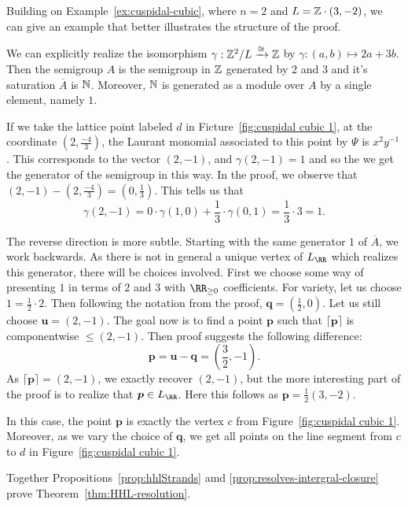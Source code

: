 \documentclass{amsart}
\begin{document}
\begin{example}
  Building on Example~\ref{ex:cuspidal-cubic}, where $n=2$ and $L=\mathbb Z\cdot (3,-2)$, we can give an example that better illustrates the structure of the proof.

  We can explicitly realize the isomorphism $\gamma:\mathbb Z^2/L\xrightarrow{\cong} \mathbb Z$ by $\gamma:(a,b)\mapsto 2a+3b$. Then the semigroup $A$ is the semigroup in $\mathbb Z$ generated by $2$ and $3$ and it's saturation $\overline{A}$ is $\mathbb N$. Moreover, $\mathbb N$ is generated as a module over $A$ by a single element, namely $1$.

  If we take the lattice point labeled $d$ in Ficture~\ref{fig:cuspidal cubic 1}, at the coordinate $(2,\frac{-4}{3})$, the Laurant monomial associated to this point by $\Psi$ is $x^2y^{-1}$.
  This corresponds to the vector $(2,-1)$, and $\gamma(2,-1)=1$ and so the we get the generator of the semigroup in this way.
  In the proof, we observe that $(2,-1)-(2,\frac{-4}{3})=(0,\frac{1}{3})$. This tells us that
  \[\gamma(2,-1) = 0\cdot \gamma(1,0) + \frac{1}{3}\cdot \gamma(0,1)=\frac{1}{3}\cdot 3 = 1.\]

  The reverse direction is more subtle. Starting with the same generator $1$ of $\overline{A}$, we work backwards. As there is not in general a unique vertex of $L_{\RR}$ which realizes this generator, there will be choices involved.
  First we choose some way of presenting $1$ in terms of $2$ and $3$ with $\RR_{\geq 0}$ coefficients. For variety, let us choose $1=\frac{1}{2}\cdot 2$.
  Then following the notation from the proof, $\mathbf{q}=(\frac{1}{2},0)$. Let us still choose $\bm{u}=(2,-1)$.
  The goal now is to find a point $\bm{p}$ such that $\lceil \bm{p} \rceil$ is componentwise $\leq (2,-1)$.
  Then proof suggests the following difference:
  \[\bm{p}=\bm{u}-\bm{q} = (\frac{3}{2},-1).\]
  As $\lceil \bm{p} \rceil = (2,-1)$, we exactly recover $(2,-1)$, but the more interesting part of the proof is to realize that $\bm{p}\in L_{\RR}$. Here this follows as $\bm{p}=\frac{1}{2}(3,-2)$.

  In this case, the point $\bm{p}$ is exactly the vertex $c$ from Figure~\ref{fig:cuspidal cubic 1}. Moreover, as we vary the choice of $\bm{q}$, we get all points on the line segment from $c$ to $d$ in Figure~\ref{fig:cuspidal cubic 1}. 
\end{example}

Together Propositions~\ref{prop:hhlStrands} amd \ref{prop:resolves-intergral-closure} prove Theorem~\ref{thm:HHL-resolution}.
\end{document}
